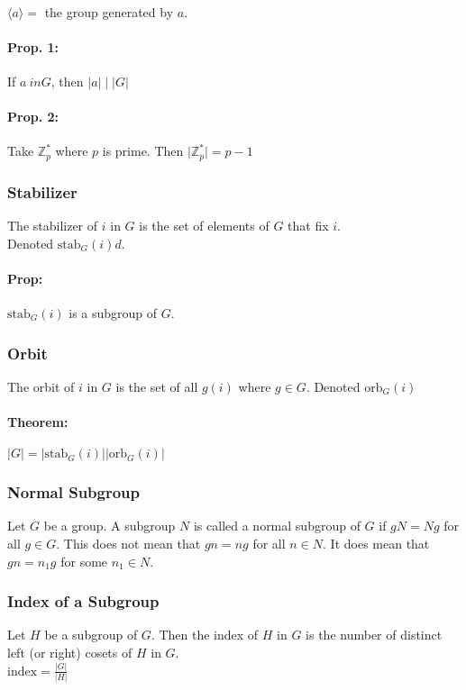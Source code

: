 \documentclass[11pt, letterpaper]{article}
\newcommand{\ord}[1]{\lvert{#1}\rvert}
\newcommand{\stab}{\mathrm{stab}}
\newcommand{\orb}{\mathrm{orb}}
\newcommand{\ordiv}[2]{\ord{{#1}} \mid \ord{{#2}}}
\newcommand{\genby}[1]{\langle {#1} \rangle}
\begin{document}
\paragraph{}
	$\genby{a} = $ the group generated by $a$.

\paragraph{Prop. 1: }
	If $a \ in G$, then $\ordiv{a}{G}$

\paragraph{Prop. 2: }
	Take $\mathbb{Z}_p^*$ where $p$ is prime.
	Then $\ord{\mathbb{Z}_p^*} = p-1$




\subsubsection{Stabilizer}
	The stabilizer of $i$ in $G$ is the set of elements of $G$ that fix $i$. \\
	Denoted $\stab_G (i)d$.

		\paragraph{Prop: }
			$\stab_G(i)$ is a subgroup of $G$.

\subsubsection{Orbit}
	The orbit of $i$ in $G$ is the set of all $g(i)$ where $g \in G$.
	Denoted $\orb_G(i)$

\paragraph{Theorem: }
	$\ord{G} = \ord{\stab_G(i)} \ord{\orb_G(i)}$


\subsubsection{Normal Subgroup}
	Let $G$ be a group.
	A subgroup $N$ is called a normal subgroup of $G$ if $gN = Ng$ for all $g \in G$.
	This does not mean that $gn = ng$ for all $n \in N$.
	It does mean that $gn = n_1 g$ for some $n_1 \in N.$

\subsubsection{Index of a Subgroup}
	Let $H$ be a subgroup of $G$.
	Then the index of $H$ in $G$ is the number of distinct left (or right) cosets of $H$ in $G$. \\
	$\text{index} = \frac{\ord{G}}{\ord{H}}$
\end{document}
